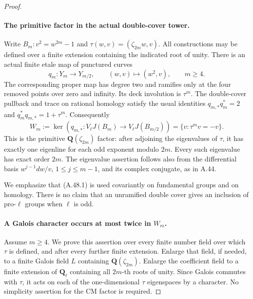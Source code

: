 \begin{proof}
\paragraph{The primitive factor in the actual double-cover tower.}
Write \(B_m:v^2=w^{2m}-1\) and
\(\tau(w,v)=(\zeta_{2m}w,v)\). All constructions
may be defined over a finite extension containing the
indicated root of unity. There is an actual finite
etale map of punctured curves
\[
 q_m:Y_m\longrightarrow Y_{m/2},\qquad
                         (w,v)\longmapsto(w^2,v),
                    \qquad m\ge4.                  \tag{A.48.1}
\]
The corresponding proper map has degree two and
ramifies only at the four removed points over zero
and infinity. Its deck involution is \(\tau^m\).
The double-cover pullback and trace on rational
homology satisfy the usual identities
\(q_{m,*}q_m^*=2\) and
\(q_m^*q_{m,*}=1+\tau^m\). Consequently
\[
 W_m:=\ker(q_{m,*}:V_\ell J(B_m)\to V_\ell J(B_{m/2}))
                 =\{v:\tau^m v=-v\}.              \tag{A.48.2}
\]
This is the primitive \(\mathbf Q(\zeta_{2m})\)
factor: after adjoining the eigenvalues of \(\tau\),
it has exactly one eigenline for each odd exponent
modulo \(2m\). Every such eigenvalue has exact
order \(2m\). The eigenvalue assertion follows also
from the differential basis
\(w^{j-1}dw/v\), \(1\le j\le m-1\), and its
complex conjugate, as in A.44.

We emphasize that (A.48.1) is used covariantly on
fundamental groups and on homology. There is no
claim that an unramified double cover gives an
inclusion of pro-\(\ell\) groups when \(\ell\)
is odd.

\paragraph{A Galois character occurs at most twice in \(W_m\).}
Assume \(m\ge4\). We prove this assertion over every
finite number field over which \(\tau\) is defined,
and after every further finite extension. Enlarge
that field, if needed, to a finite Galois field \(L\)
containing \(\mathbf Q(\zeta_{2m})\). Enlarge the
coefficient field to a finite extension of
\(\mathbf Q_\ell\) containing all \(2m\)-th roots
of unity. Since Galois commutes with \(\tau\),
it acts on each of the one-dimensional \(\tau\)
eigenspaces by a character. No simplicity assertion
for the CM factor is required.


\end{proof}
